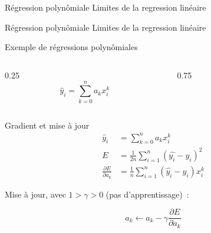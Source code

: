 
\begin{frame}{Régression polynômiale}
  Limites de la regression linéaire
\end{frame}

\begin{frame}{Régression polynômiale}
  Limites de la regression linéaire
\end{frame}

\begin{frame}{Exemple de régressions polynômiales}
  \begin{columns}
    \begin{column}{0.25\tw}
      \[
        \hat{y}_i = \sum_{k = 0}^n a_kx_i^k
      \]
    \end{column}
    \begin{column}{0.75\tw}
    \end{column}
  \end{columns}
\end{frame}

\begin{frame}{Gradient et mise à jour}
  \begin{align*}
    \hat{y}_i & = \sum_{k = 0}^n{a_kx_i^k} \\
    E & = \frac{1}{2n}\sum_{i=1}^n( \hat{y_i} - y_i )^2 \\
    \frac{\partial{E}}{\partial{a_k}} & = \frac{1}{n}\sum_{i=1}^n(\hat{y_i} - y_i)x_i^k
  \end{align*}

  Mise à jour, avec $1 > \gamma > 0$ (pas d'apprentissage)~:

  \[
    a_k \leftarrow a_k - \gamma\frac{\partial{E}}{\partial{a_k}}
  \]
\end{frame}
